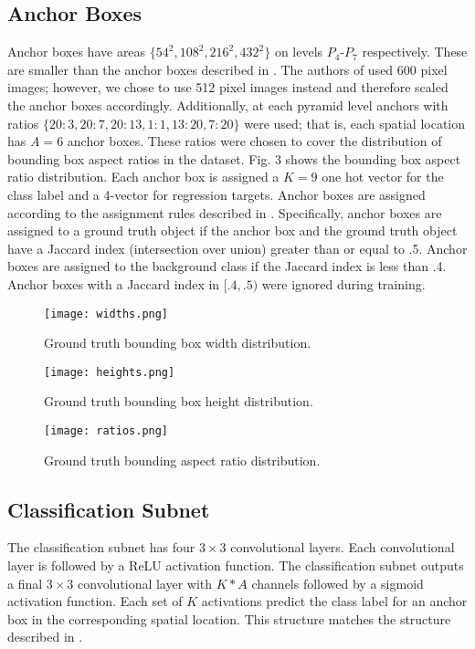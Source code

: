 \documentclass[conference]{IEEEtran}
\begin{document}
\subsection{Anchor Boxes}
Anchor boxes have areas $\{54^2, 108^2, 216^2, 432^2\}$ on levels $P_4$-$P_7$ respectively. These are smaller than the anchor boxes described in \cite{retinanet}. The authors of \cite{retinanet} used 600 pixel images; however, we chose to use 512 pixel images instead and therefore scaled the anchor boxes accordingly. Additionally, at each pyramid level anchors with ratios $\{20:3, 20:7, 20:13, 1:1, 13:20, 7:20\}$ were used; that is, each spatial location has $A = 6$ anchor boxes. These ratios were chosen to cover the distribution of bounding box aspect ratios in the dataset. Fig. 3 shows the bounding box aspect ratio distribution. Each anchor box is assigned a $K = 9$ one hot vector for the class label and a 4-vector for regression targets. Anchor boxes are assigned according to the assignment rules described in \cite{retinanet}. Specifically, anchor boxes are assigned to a ground truth object if the anchor box and the ground truth object have a Jaccard index (intersection over union) greater than or equal to .5. Anchor boxes are assigned to the background class if the Jaccard index is less than .4. Anchor boxes with a Jaccard index in $[.4,.5)$ were ignored during training.

\begin{figure*}[htbp]
  \texttt{[image: widths.png]}
  \caption{Ground truth bounding box width distribution.}\label{fig:awesome_image2}
\endminipage\hfill
{}
  \texttt{[image: heights.png]}
  \caption{Ground truth bounding box height distribution.}\label{fig:awesome_image1}
\endminipage\hfill
{}%
  \texttt{[image: ratios.png]}
  \caption{Ground truth bounding aspect ratio distribution.}\label{fig:awesome_image3}
\endminipage
\label{fig}
\end{figure*}

\subsection{Classification Subnet}
The classification subnet has four $3 \times 3$ convolutional layers. Each convolutional layer is followed by a ReLU activation function. The classification subnet outputs a final $3 \times 3$ convolutional layer with $K * A$ channels followed by a sigmoid activation function. Each set of $K$ activations predict the class label for an anchor box in the corresponding spatial location. This structure matches the structure described in \cite{retinanet}.
\end{document}
